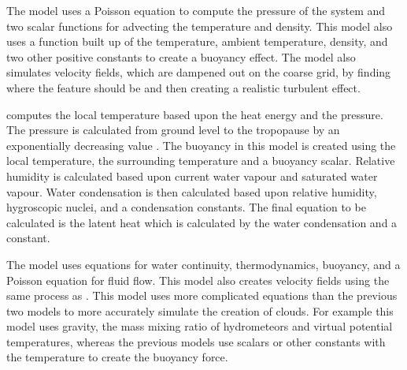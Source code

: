 The \citet*{Fedkiw01} model uses a Poisson equation to compute the pressure of the system and two scalar functions for advecting the temperature and density.
This model also uses a function built up of the temperature, ambient temperature, density, and two other positive constants to create a buoyancy effect.
The model also simulates velocity fields, which are dampened out on the coarse grid, by finding where the feature should be and then creating a realistic turbulent effect.

\citet*{DOverby02} computes the local temperature based upon the heat energy and the pressure.
The pressure is calculated from ground level to the tropopause by an exponentially decreasing value \citep*{DOverby02}.
The buoyancy in this model is created using the local temperature, the surrounding temperature and a buoyancy scalar.
Relative humidity is calculated based upon current water vapour and saturated water vapour.
Water condensation is then calculated based upon relative humidity, hygroscopic nuclei, and a condensation constants.
The final equation to be calculated is the latent heat which is calculated by the water condensation and a constant.
 
The \citet{HarrisEtAl03} model uses equations for water continuity, thermodynamics, buoyancy, and a Poisson equation for fluid flow.
This model also creates velocity fields using the same process as \citet*{Fedkiw01}.
This model uses more complicated equations than the previous two models to more accurately simulate the creation of clouds.
For example this model uses gravity, the mass mixing ratio of hydrometeors and virtual potential temperatures, whereas the previous models use scalars or other constants with the temperature to create the buoyancy force.